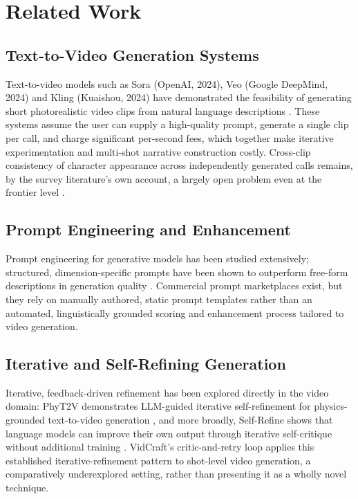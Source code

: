 \documentclass[11pt,a4paper]{article}
\begin{document}
\needspace{0.5\textheight}
\section{Related Work}

\subsection{Text-to-Video Generation Systems}
Text-to-video models such as Sora (OpenAI, 2024), Veo (Google DeepMind, 2024) and Kling (Kuaishou, 2024) have demonstrated the feasibility of generating short photorealistic video clips from natural language descriptions \cite{sora,veo,controllable_survey}. These systems assume the user can supply a high-quality prompt, generate a single clip per call, and charge significant per-second fees, which together make iterative experimentation and multi-shot narrative construction costly. Cross-clip consistency of character appearance across independently generated calls remains, by the survey literature's own account, a largely open problem even at the frontier level \cite{controllable_survey}.

\subsection{Prompt Engineering and Enhancement}
Prompt engineering for generative models has been studied extensively; structured, dimension-specific prompts have been shown to outperform free-form descriptions in generation quality \cite{devil_in_prompts}. Commercial prompt marketplaces exist, but they rely on manually authored, static prompt templates rather than an automated, linguistically grounded scoring and enhancement process tailored to video generation.

\subsection{Iterative and Self-Refining Generation}
Iterative, feedback-driven refinement has been explored directly in the video domain: PhyT2V demonstrates LLM-guided iterative self-refinement for physics-grounded text-to-video generation \cite{phyt2v}, and more broadly, Self-Refine shows that language models can improve their own output through iterative self-critique without additional training \cite{selfrefine}. VidCraft's critic-and-retry loop applies this established iterative-refinement pattern to shot-level video generation, a comparatively underexplored setting, rather than presenting it as a wholly novel technique.
\end{document}
